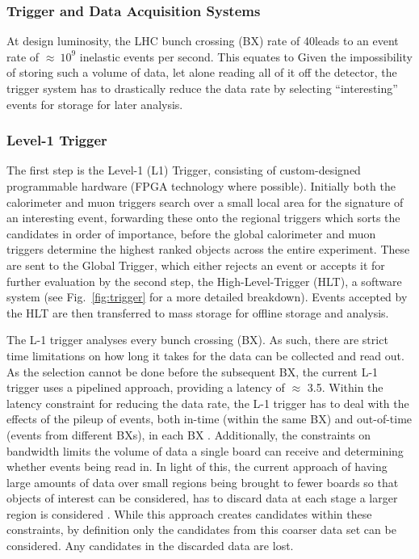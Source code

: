 \subsubsection{Trigger and Data Acquisition Systems}
At design luminosity, the LHC bunch crossing (BX) rate of 40\MHz leads to an event rate of $\approx~10^{9}$ inelastic events per second.
This equates to 
Given the impossibility of storing such a volume of data, let alone reading all of it off the detector, the trigger system has to drastically reduce the data rate by selecting ``interesting'' events for storage for later analysis.

\subsubsection{Level-1 Trigger}
The first step is the Level-1 (L1) Trigger, consisting of custom-designed programmable hardware (FPGA technology where possible). 
Initially both the calorimeter and muon triggers search over a small local area for the signature of an interesting event, forwarding these onto the regional triggers which sorts the candidates in order of importance, before the global calorimeter and muon triggers determine the highest ranked objects across the entire experiment. 
These are sent to the Global Trigger, which either rejects an event or accepts it for further evaluation by the second step, the High-Level-Trigger (HLT), a software system (see Fig.~\ref{fig:trigger} for a more detailed breakdown). 
Events accepted by the HLT are then transferred to mass storage for offline storage and analysis\cite{oldcms}. 

The L-1 trigger analyses every bunch crossing (BX). 
As such, there are strict time limitations on how long it takes for the data can be collected and read out. 
As the selection cannot be done before the subsequent BX, the current L-1 trigger uses a pipelined approach, providing a latency of $\approx$ 3.5\mus . 
Within the latency constraint for reducing the data rate, the L-1 trigger has to deal with the effects of the pileup of events, both in-time (within the same BX) and out-of-time (events from different BXs), in each BX . 
Additionally, the constraints on bandwidth limits the volume of data a single board can receive and determining whether events being read in. 
In light of this, the current approach of having large amounts of data over small regions being brought to fewer boards so that objects of interest can be considered, has to discard data at each stage a larger region is considered . 
While this approach creates candidates within these constraints, by definition only the candidates from this coarser data set can be considered. 
Any candidates in the discarded data are lost\cite{oldcms}.

